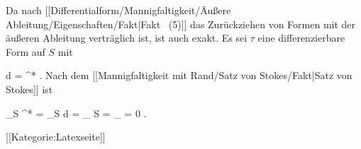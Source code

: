 Da nach
[[Differentialform/Mannigfaltigkeit/Äußere Ableitung/Eigenschaften/Fakt|Fakt   (5)]]
das Zurückziehen von Formen mit der äußeren Ableitung verträglich ist, ist auch
\mathl{\varphi^*\omega}{} exakt. Es sei $\tau$ eine differenzierbare Form auf $S$ mit

\mavergleichskettedisp
{\vergleichskette
{d \tau
}
{ =} { \varphi^* \omega
}
{ } {
}
{ } {
}
{ } {
}
}
{}{}{.}
Nach
dem [[Mannigfaltigkeit mit Rand/Satz von Stokes/Fakt|Satz von Stokes]]
ist

\mavergleichskettedisp
{\vergleichskette
{ \int_S \varphi^* \omega
}
{ =} { \int_S d \tau
}
{ =} { \int_{ \partial S } \tau
}
{ =} { \int_\emptyset \tau
}
{ =} { 0
}
}
{}{}{.}

 [[Kategorie:Latexseite]]
